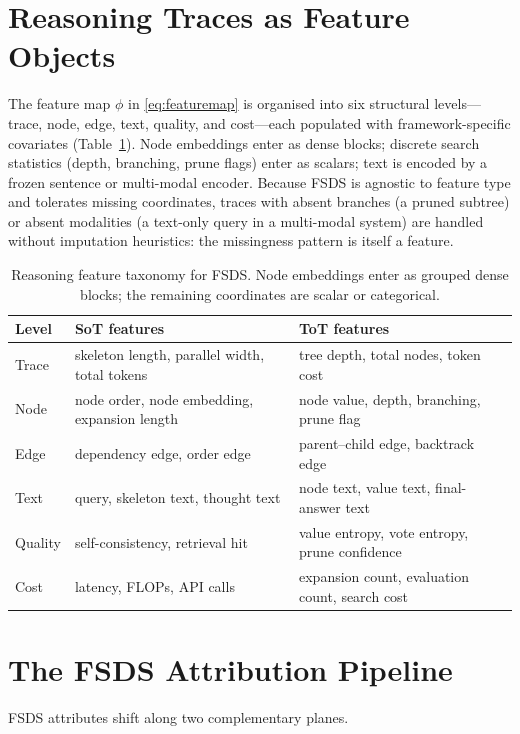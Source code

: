 \documentclass[11pt]{article}
\begin{document}
\section{Reasoning Traces as Feature Objects}
\label{sec:features}

The feature map $\phi$ in \eqref{eq:featuremap} is organised into six structural
levels---trace, node, edge, text, quality, and cost---each populated with
framework-specific covariates (Table~\ref{tab:taxonomy}). Node embeddings enter
as dense blocks; discrete search statistics (depth, branching, prune flags) enter
as scalars; text is encoded by a frozen sentence or multi-modal encoder. Because
FSDS is agnostic to feature type and tolerates missing coordinates, traces with
absent branches (a pruned subtree) or absent modalities (a text-only query in a
multi-modal system) are handled without imputation heuristics: the missingness
pattern is itself a feature.

\begin{table}[t]
\centering
\caption{Reasoning feature taxonomy for FSDS. Node embeddings enter as grouped
dense blocks; the remaining coordinates are scalar or categorical.}
\label{tab:taxonomy}
\small
\begin{tabular}{lll}
\toprule
Level & SoT features & ToT features \\
\midrule
Trace & skeleton length, parallel width, total tokens & tree depth, total nodes, token cost \\
Node & node order, node embedding, expansion length & node value, depth, branching, prune flag \\
Edge & dependency edge, order edge & parent--child edge, backtrack edge \\
Text & query, skeleton text, thought text & node text, value text, final-answer text \\
Quality & self-consistency, retrieval hit & value entropy, vote entropy, prune confidence \\
Cost & latency, FLOPs, API calls & expansion count, evaluation count, search cost \\
\bottomrule
\end{tabular}
\end{table}

\section{The FSDS Attribution Pipeline}
\label{sec:pipeline}

FSDS attributes shift along two complementary planes.
\end{document}
